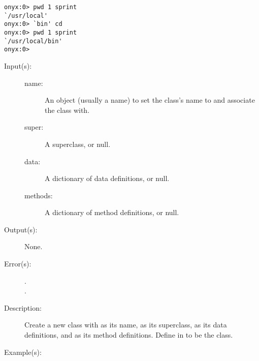 \begin{description}
\begin{description}
\begin{verbatim}
onyx:0> pwd 1 sprint
`/usr/local'
onyx:0> `bin' cd
onyx:0> pwd 1 sprint
`/usr/local/bin'
onyx:0>
		\end{verbatim}
	\end{description}
\label{systemdict:cdef}
\item[{\onyxop{name super data methods}{cdef}{--}}: ]
	\begin{description}\item[]
	\item[Input(s): ]
		\begin{description}\item[]
		\item[name: ]
			An object (usually a name) to set the class's name
			to and associate the class with.
		\item[super: ]
			A superclass, or null.
		\item[data: ]
			A dictionary of data definitions, or null.
		\item[methods: ]
			A dictionary of method definitions, or null.
		\end{description}
	\item[Output(s): ] None.
	\item[Error(s): ]
		\begin{description}\item[]
		\item[.]
		\item[.]
		\end{description}
	\item[Description: ]
		Create a new class with  as its name, 
		as its superclass,  as its data definitions, and
		 as its method definitions.  Define 
		in  to
		be the class.
	\item[Example(s): ]\begin{verbatim}


\end{verbatim}
\end{description}
\end{description}

